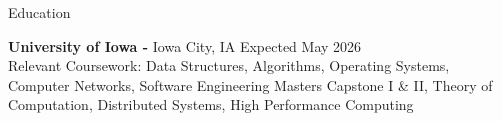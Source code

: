 \documentclass{resume} %
\begin{document}
%



\begin{rSection}{Education}

{\bf University of Iowa -} Iowa City, IA  \hfill {Expected May 2026}\\ 
Relevant Coursework: Data Structures, Algorithms, Operating Systems, Computer Networks, Software Engineering Masters Capstone I \& II, Theory of Computation, Distributed Systems, High Performance Computing


\end{rSection}

\end{document}

